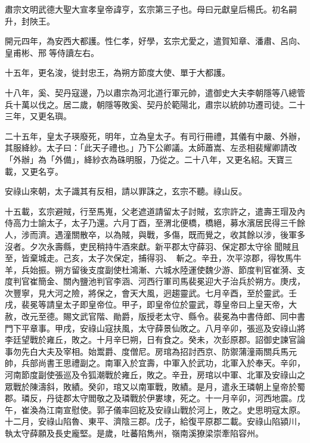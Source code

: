
\begin{pinyinscope}

 肅宗文明武德大聖大宣孝皇帝諱亨，玄宗第三子也。母曰元獻皇后楊氏。初名嗣升，封陜王。



 開元四年，為安西大都護。性仁孝，好學，玄宗尤愛之，遣賀知章、潘肅、呂向、皇甫彬、邢等侍讀左右。



 十五年，更名浚，徙封忠王，為朔方節度大使、單于大都護。



 十八年，奚、契丹寇邊，乃以肅宗為河北道行軍元帥，遣御史大夫李朝隱等八總管兵十萬以伐之。居二歲，朝隱等敗奚、契丹於範陽北，肅宗以統帥功遷司徒。二十三年，又更名璵。



 二十五年，皇太子瑛廢死，明年，立為皇太子。有司行冊禮，其儀有中嚴、外辦，其服絳紗。太子曰：「此天子禮也。」乃下公卿議。太師蕭嵩、左丞相裴耀卿請改「外辦」為「外備」，絳紗衣為硃明服，乃從之。二十八年，又更名紹。天寶三載，又更名亨。



 安祿山來朝，太子識其有反相，請以罪誅之，玄宗不聽。祿山反。



 十五載，玄宗避賊，行至馬嵬，父老遮道請留太子討賊，玄宗許之，遣壽王瑁及內侍高力士諭太子，太子乃還。六月丁酉，至渭北便橋，橋絕，募水濱居民得三千餘人，涉而濟。遇潼關散卒，以為賊，與戰，多傷，既而覺之，收其餘以涉，後軍多沒者。夕次永壽縣，吏民稍持牛酒來獻。新平郡太守薛羽、保定郡太守徐聞賊且至，皆棄城走。己亥，太子次保定，捕得羽、，斬之。辛丑，次平涼郡，得牧馬牛羊，兵始振。朔方留後支度副使杜鴻漸、六城水陸運使魏少游、節度判官崔漪、支度判官崔簡金、關內鹽池判官李涵、河西行軍司馬裴冕迎大子治兵於朔方。庚戌，次豐寧，見大河之險，將保之，會天大風，迥趨靈武。七月辛酉，至於靈武。壬戌，裴冕等請皇太子即皇帝位。甲子，即皇帝位於靈武，尊皇帝曰上皇天帝，大赦，改元至德。賜文武官階、勛爵，版授老太守、縣令。裴冕為中書侍郎、同中書門下平章事。甲戌，安祿山寇扶風，太守薛景仙敗之。八月辛卯，張巡及安祿山將李廷望戰於雍丘，敗之。十月辛巳朔，日有食之。癸未，次彭原郡。詔御史諫官論事勿先白大夫及宰相。始鬻爵、度僧尼。房琯為招討西京、防禦蒲潼兩關兵馬元帥，兵部尚書王思禮副之。南軍入於宜壽，中軍入於武功，北軍入於奉天。辛卯，河南節度副使張巡及令狐潮戰於雍丘，敗之。辛丑，房琯以中軍、北軍及安祿山之眾戰於陳濤斜，敗績。癸卯，琯又以南軍戰，敗績。是月，遣永王璘朝上皇帝於蜀郡。璘反，丹徒郡太守閻敬之及璘戰於伊婁埭，死之。十一月辛卯，河西地震。戊午，崔渙為江南宣慰使。郭子儀率回紇及安祿山戰於河上，敗之。史思明寇太原。十二月，安祿山陷魯、東平、濟陰三郡。戊子，給復平原郡二載。安祿山陷潁川，執太守薛願及長史龐堅。是歲，吐蕃陷雋州，嶺南溪獠梁崇牽陷容州。




\end{pinyinscope}
